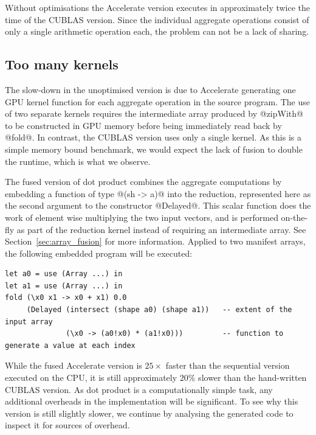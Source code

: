 Without optimisations the Accelerate version executes in approximately twice the
time of the CUBLAS version. Since the individual aggregate operations consist of
only a single arithmetic operation each, the problem can not be a lack of
sharing.


\subsection{Too many kernels}

The slow-down in the unoptimised version is due to Accelerate generating one GPU
kernel function for each aggregate operation in the source program. The use of
two separate kernels requires the intermediate array produced by @zipWith@ to be
constructed in GPU memory before being immediately read back by @fold@. In
contrast, the CUBLAS version uses only a single kernel. As this is a simple
memory bound benchmark, we would expect the lack of fusion to double the
runtime, which is what we observe.

The fused version of dot product combines the aggregate computations by
embedding a function of type @(sh -> a)@ into the reduction, represented
here as the second argument to the constructor @Delayed@. This scalar
function does the work of element wise multiplying the two input vectors, and is
performed on-the-fly as part of the reduction kernel instead of requiring an
intermediate array. See Section~\ref{sec:array_fusion} for more information.
Applied to two manifest arrays, the following embedded program will be executed:

\begin{lstlisting}[style=haskell]
let a0 = use (Array ...) in
let a1 = use (Array ...) in
fold (\x0 x1 -> x0 + x1) 0.0
     (Delayed (intersect (shape a0) (shape a1))   -- extent of the input array
              (\x0 -> (a0!x0) * (a1!x0)))         -- function to generate a value at each index
\end{lstlisting}

While the fused Accelerate version is $25\times$ faster than the sequential
version executed on the CPU, it is still approximately $20\%$ slower than the
hand-written CUBLAS version. As dot product is a computationally simple task,
any additional overheads in the implementation will be significant. To see why
this version is still slightly slower, we continue by analysing the generated
code to inspect it for sources of overhead.


